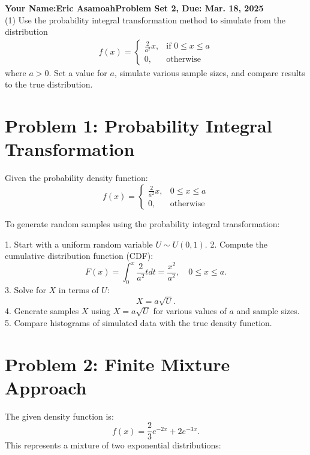 \documentclass[final,11pt]{article}
\begin{document}
\thispagestyle{empty}
\begin{spacing}{1.25}

\textbf{Your Name:Eric Asamoah\hfill Problem Set 2, Due: Mar. 18, 2025}\\

(1) Use the probability integral transformation method to simulate from the distribution
\begin{gather}
    f(x) = 
    \begin{cases}
        \frac{2}{a^2}x,  & \text{if }0\leq x\leq a \\
        0, & \text{otherwise}
    \end{cases}
\end{gather}
where $a>0$. Set a value for $a$, simulate various sample sizes, and compare results to the true distribution.



\section*{Problem 1: Probability Integral Transformation}
Given the probability density function:
\begin{equation}
    f(x) = \begin{cases} \frac{2}{a^2} x, & 0 \leq x \leq a \\ 0, & \text{otherwise} \end{cases}
\end{equation}

To generate random samples using the probability integral transformation:

1. Start with a uniform random variable $U \sim U(0,1)$.
2. Compute the cumulative distribution function (CDF):
   \begin{equation}
       F(x) = \int_0^x \frac{2}{a^2} t dt = \frac{x^2}{a^2}, \quad 0 \leq x \leq a.
   \end{equation}
3. Solve for $X$ in terms of $U$: 
   \begin{equation}
       X = a\sqrt{U}.
   \end{equation}
4. Generate samples $X$ using $X = a\sqrt{U}$ for various values of $a$ and sample sizes.
5. Compare histograms of simulated data with the true density function.


\section*{Problem 2: Finite Mixture Approach}
The given density function is:
\begin{equation}
    f(x) = \frac{2}{3} e^{-2x} + 2 e^{-3x}.
\end{equation}
This represents a mixture of two exponential distributions:


\end{spacing}
\end{document}
